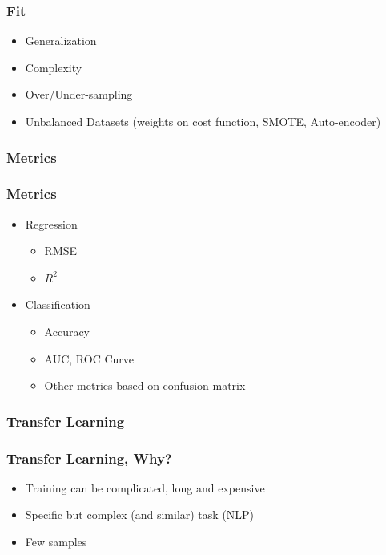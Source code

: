 \begin{frame}\frametitle{Fit}
   \begin{itemize}
      \item Generalization
      \item Complexity
      \item Over/Under-sampling
      \item Unbalanced Datasets (weights on cost function, SMOTE, Auto-encoder)
   \end{itemize}
\end{frame}


\subsubsection{Metrics}

\begin{frame}\frametitle{Metrics}
   \begin{itemize}
      \item Regression
      \begin{itemize}
         \item RMSE
         \item $R^2$
      \end{itemize}

      \item Classification
      \begin{itemize}
         \item Accuracy
         \item AUC, ROC Curve
         \item Other metrics based on confusion matrix
      \end{itemize}
   \end{itemize}
\end{frame}


\subsubsection{Transfer Learning}

\begin{frame}\frametitle{Transfer Learning, Why?}
   \begin{itemize}
      \item Training can be complicated, long and expensive
      \item Specific but complex (and similar) task (NLP)
      \item Few samples
   \end{itemize}
\end{frame}


